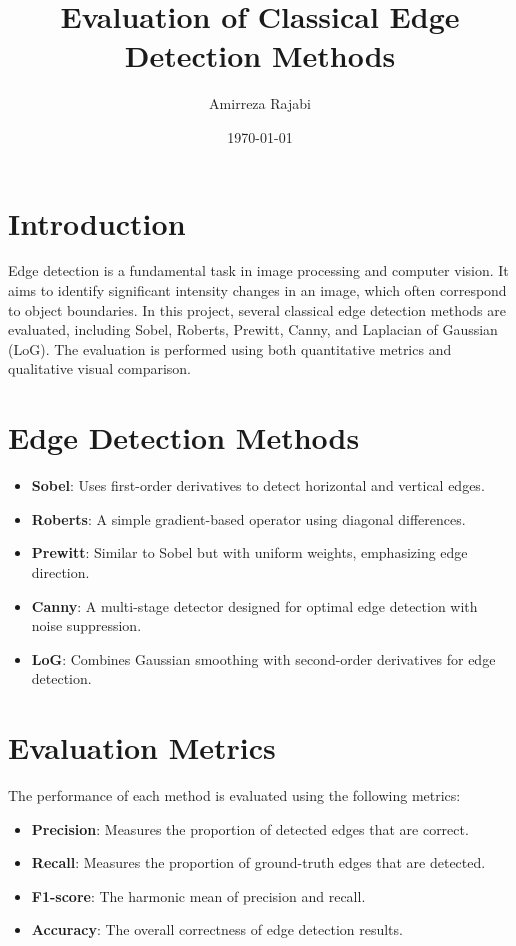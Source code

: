 \documentclass[12pt]{article}
\title{Evaluation of Classical Edge Detection Methods}
\author{Amirreza Rajabi}
\date{\today}
\begin{document}
\maketitle

\section{Introduction}

Edge detection is a fundamental task in image processing and computer vision. 
It aims to identify significant intensity changes in an image, which often correspond to object boundaries. 
In this project, several classical edge detection methods are evaluated, including Sobel, Roberts, Prewitt, Canny, and Laplacian of Gaussian (LoG).
The evaluation is performed using both quantitative metrics and qualitative visual comparison.

\section{Edge Detection Methods}

\begin{itemize}
\item \textbf{Sobel}: Uses first-order derivatives to detect horizontal and vertical edges.
\item \textbf{Roberts}: A simple gradient-based operator using diagonal differences.
\item \textbf{Prewitt}: Similar to Sobel but with uniform weights, emphasizing edge direction.
\item \textbf{Canny}: A multi-stage detector designed for optimal edge detection with noise suppression.
\item \textbf{LoG}: Combines Gaussian smoothing with second-order derivatives for edge detection.
\end{itemize}

\section{Evaluation Metrics}

The performance of each method is evaluated using the following metrics:

\begin{itemize}
\item \textbf{Precision}: Measures the proportion of detected edges that are correct.
\item \textbf{Recall}: Measures the proportion of ground-truth edges that are detected.
\item \textbf{F1-score}: The harmonic mean of precision and recall.
\item \textbf{Accuracy}: The overall correctness of edge detection results.
\end{itemize}
\end{document}
